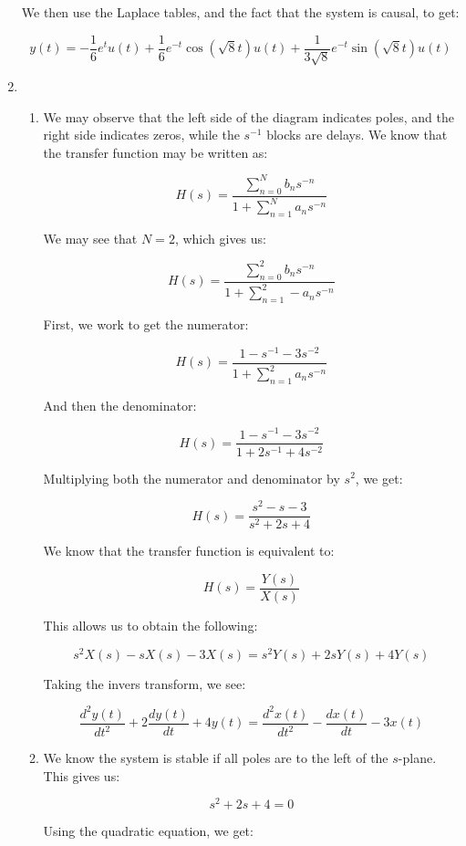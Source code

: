 \begin{enumerate}
    We then use the Laplace tables, and the fact that the system is causal, to get:

    $$\boxed{y(t)=-\frac{1}{6}e^{t}u(t)+\frac{1}{6}e^{-t}\cos(\sqrt{8}t)u(t)+\frac{1}{3\sqrt{8}}e^{-t}\sin(\sqrt{8}t)u(t)}$$

  \item

    \begin{enumerate}

      \item We may observe that the left side of the diagram indicates poles, and the right side indicates zeros, while the $s^{-1}$ blocks are delays. We know that the transfer function may be written as:

        $$H(s)=\dfrac{\displaystyle \sum_{n=0}^Nb_ns^{-n}}{\displaystyle 1+\sum_{n=1}^{N}a_ns^{-n}}$$

        We may see that $N=2$, which gives us:

        $$H(s)=\dfrac{\displaystyle \sum_{n=0}^2b_ns^{-n}}{\displaystyle 1+\sum_{n=1}^{2}-a_ns^{-n}}$$

        First, we work to get the numerator:

        $$H(s)=\frac{1-s^{-1}-3s^{-2}}{1+\sum_{n=1}^{2}a_ns^{-n}}$$

        And then the denominator:

        $$H(s)=\frac{1-s^{-1}-3s^{-2}}{1+2s^{-1}+4s^{-2}}$$

        Multiplying both the numerator and denominator by $s^2$, we get:

        $$H(s)=\frac{s^2-s-3}{s^2+2s+4}$$

        We know that the transfer function is equivalent to:

        $$H(s)=\frac{Y(s)}{X(s)}$$

        This allows us to obtain the following:

        $$s^2X(s)-sX(s)-3X(s)=s^2Y(s)+2sY(s)+4Y(s)$$

        Taking the invers transform, we see:

        $$\boxed{\frac{d^2y(t)}{dt^2}+2\frac{dy(t)}{dt}+4y(t)=\frac{d^2x(t)}{dt^2}-\frac{dx(t)}{dt}-3x(t)}$$

      \item We know the system is stable if all poles are to the left of the $s$-plane. This gives us:

        $$s^2+2s+4=0$$

        Using the quadratic equation, we get:


\end{enumerate}
\end{enumerate}
